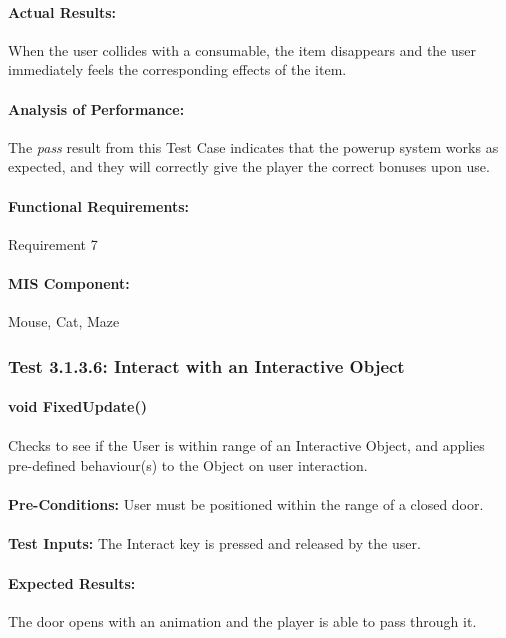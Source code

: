 \documentclass{article}
\begin{document}
    \paragraph{Actual Results:} When the user collides with a consumable, the item disappears and the user immediately feels the corresponding effects of the item.
    \paragraph{Analysis of Performance:} The \emph{pass} result from this Test Case indicates that the powerup system works as expected, and they will correctly give the player the correct bonuses upon use.
    \paragraph{Functional Requirements:} Requirement 7
    \paragraph{MIS Component:} Mouse, Cat, Maze
    
     \subsubsection{Test 3.1.3.6: Interact with an Interactive Object}
    \paragraph{}\textbf{void FixedUpdate()}
    \paragraph{} Checks to see if the User is within range of an Interactive Object, and applies pre-defined behaviour(s) to the Object on user interaction.
    \paragraph{}\textbf{Pre-Conditions:} User must be positioned within the range of a closed door.
    \paragraph{}\textbf{Test Inputs:} The Interact key is pressed and released by the user.
    \paragraph{Expected Results:} The door opens with an animation and the player is able to pass through it.
\end{document}
